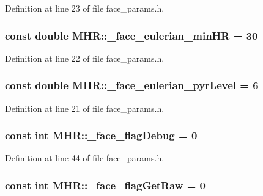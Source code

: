Definition at line 23 of file face\+\_\+params.\+h.

\hypertarget{namespace_m_h_r_a95e1651df07df85f364ac713aac7a53b}{
\subsubsection[{\+\_\+face\+\_\+eulerian\+\_\+min\+H\+R}]{\setlength{\rightskip}{0pt plus 5cm}const double M\+H\+R\+::\+\_\+face\+\_\+eulerian\+\_\+min\+H\+R = 30}}\label{namespace_m_h_r_a95e1651df07df85f364ac713aac7a53b}


Definition at line 22 of file face\+\_\+params.\+h.

\hypertarget{namespace_m_h_r_a3eae7b41b03bf25902413f62c5e6545d}{
\subsubsection[{\+\_\+face\+\_\+eulerian\+\_\+pyr\+Level}]{\setlength{\rightskip}{0pt plus 5cm}const double M\+H\+R\+::\+\_\+face\+\_\+eulerian\+\_\+pyr\+Level = 6}}\label{namespace_m_h_r_a3eae7b41b03bf25902413f62c5e6545d}


Definition at line 21 of file face\+\_\+params.\+h.

\hypertarget{namespace_m_h_r_ade58b99d0d2023434646cb0597baafdf}{
\subsubsection[{\+\_\+face\+\_\+flag\+Debug}]{\setlength{\rightskip}{0pt plus 5cm}const int M\+H\+R\+::\+\_\+face\+\_\+flag\+Debug = 0}}\label{namespace_m_h_r_ade58b99d0d2023434646cb0597baafdf}


Definition at line 44 of file face\+\_\+params.\+h.

\hypertarget{namespace_m_h_r_a6e9575c56ad75e4e165fd62fad98734f}{
\subsubsection[{\+\_\+face\+\_\+flag\+Get\+Raw}]{\setlength{\rightskip}{0pt plus 5cm}const int M\+H\+R\+::\+\_\+face\+\_\+flag\+Get\+Raw = 0}}\label{namespace_m_h_r_a6e9575c56ad75e4e165fd62fad98734f}


